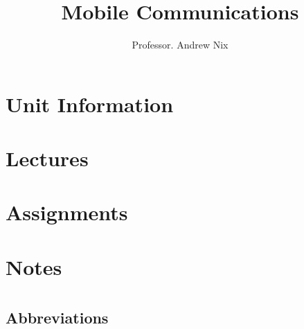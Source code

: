 \documentclass[12pt,a4paper,twoside]{book}
\author{Professor. Andrew Nix}
\title{Mobile Communications}
\theoremstyle{plain}
\theoremstyle{definition}
\begin{document}
\maketitle
\tableofcontents

\part{Unit Information}

\part{Lectures}





















\part{Assignments}
\part{Notes}

\part*{}
\chapter*{Abbreviations}


\end{document}
